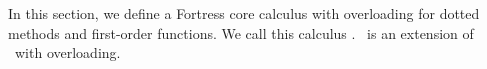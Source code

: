 %
%
%
%

\newpage
\section{\overloadingcore}

In this section, we define a Fortress core calculus with overloading
for dotted methods and first-order functions.
We call this calculus \emph{\overloadingcore}.
\overloadingcore\ is an extension of \basiccore\ with overloading.

\renewcommand{\tappone}{\ensuremath{N}}
\renewcommand{\tapptwo}{\ensuremath{M}}
\renewcommand{\tappthree}{\ensuremath{L}}
\renewcommand{\tappfour}{\ensuremath{K}}




